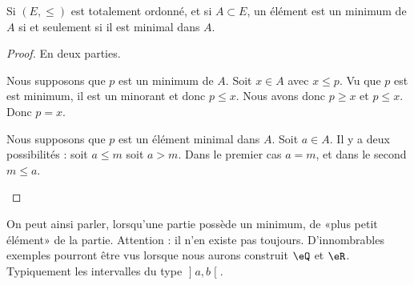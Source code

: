 \begin{proposition}	\label{PROPooUJJEooPBUenw}
	Si \( (E,\leq)\) est totalement ordonné, et si \( A\subset E\), un élément est un minimum de \( A\) si et seulement si il est minimal dans \( A\).
\end{proposition}

\begin{proof}
	En deux parties.
	\begin{subproof}
		\spitem[\( \Rightarrow\)]
		Nous supposons que \( p\) est un minimum de \( A\). Soit \( x\in A\) avec \( x\leq p\). Vu que \( p\) est est minimum, il est un minorant et donc \( p\leq x\). Nous avons donc \( p\geq x\) et \( p\leq x\). Donc \( p=x\).

		\spitem[\( \Leftarrow\)]
		Nous supposons que \( p\) est un élément minimal dans \( A\). Soit \( a\in A\). Il y a deux possibilités : soit \( a\leq m\) soit \( a>m\). Dans le premier cas \( a=m\), et dans le second \( m\leq a\).
	\end{subproof}
\end{proof}

\begin{normaltext}\label{NORMooPlusPetitElement}
	On peut ainsi parler, lorsqu'une partie possède un minimum, de «plus petit élément» de la partie. Attention : il n'en existe pas toujours. D'innombrables exemples pourront être vus lorsque nous aurons construit \( \eQ\) et \( \eR\). Typiquement les intervalles du type \( \mathopen] a , b \mathclose[\).
\end{normaltext}


